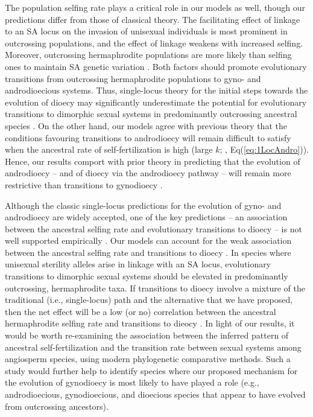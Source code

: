 \documentclass{article}
\newcommand\hl[1]{%
  \bgroup
  \hskip0pt\color{blue!80!black}%
  #1%
  \egroup
}
\begin{document}
The population selfing rate plays a critical role in our models as well, though our predictions differ from those of classical theory. The facilitating effect of linkage to an SA locus on the invasion of unisexual individuals is most prominent in outcrossing populations, and the effect of linkage weakens with increased selfing. Moreover, outcrossing hermaphrodite populations are more likely than selfing ones to maintain SA genetic variation \citep{JordanConnallon2014,Olito2017}. Both factors should promote evolutionary transitions from outcrossing hermaphrodite populations to gyno- and androdioecious systems. Thus, single-locus theory for the initial steps towards the evolution of dioecy may significantly underestimate the potential for \hl{evolutionary transitions to dimorphic sexual systems in predominantly outcrossing ancestral species}. On the other hand, our models agree with previous theory that \hl{the conditions favouring transitions to androdioecy will remain difficult to satisfy} when the ancestral rate of self-fertilization is high (large $k$; \citealt{Charlesworth1978a}, Eq(\ref{eq:1LocAndro})). Hence, our results comport with prior theory in predicting that the evolution of androdioecy -- and of dioecy via the androdioecy pathway -- will remain more restrictive than transitions to gynodioecy \citep{Charlesworth1978a, Charlesworth2006, KaferPannell2017, Renner2014}.

\hl{Although the classic single-locus predictions for the evolution of gyno- and androdioecy are widely accepted, one of the key predictions -- an association between the ancestral selfing rate and evolutionary transitions to dioecy -- is not well supported empirically \citep{Charlesworth1985, Charlesworth2006, Renner2014}. Our models can account for the weak association between the ancestral selfing rate and transitions to dioecy}. In species where unisexual sterility alleles arise in linkage with an SA locus, evolutionary transitions to dimorphic sexual systems should be elevated in \hl{predominantly outcrossing, hermaphrodite taxa. If transitions to dioecy involve a mixture of the traditional (i.e., single-locus) path and the alternative that we have proposed,  then the net effect will be a low (or no) correlation between the ancestral hermaphrodite selfing rate and transitions to dieocy}. In light of our results, it would be worth re-examining the association between the inferred pattern of ancestral self-fertilization and the transition rate between sexual systems among angiosperm species, using modern phylogenetic comparative methods. Such a study would further help to identify species where our proposed mechanism for the evolution of gynodioecy is most likely to have played a role (e.g., androdioecious, gynodioecious, and dioecious species that appear to have evolved from outcrossing ancestors).
\end{document}
